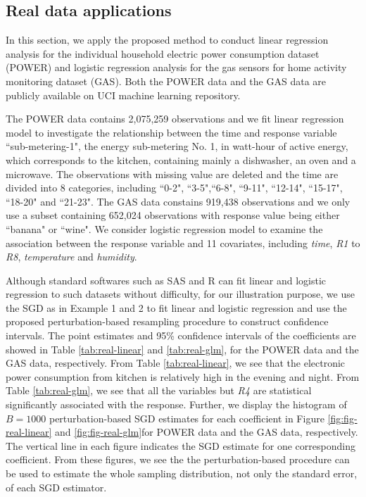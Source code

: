 \documentclass[12pt]{article}
\begin{document}
\subsection{Real data applications}

In this section, we apply the proposed method to conduct linear regression analysis for the individual household electric power consumption dataset (POWER) and logistic regression analysis for the gas sensors for home activity monitoring dataset (GAS). Both the POWER data and the GAS data are publicly available on UCI machine learning repository.

The POWER data contains 2,075,259 observations and we fit linear regression model to investigate the relationship between the time and response variable ``sub-metering-1", the energy sub-metering No. 1, in watt-hour of active energy, which corresponds to the kitchen, containing mainly a dishwasher, an oven and a microwave. The observations with missing value are deleted and the time are divided into 8 categories, including ``0-2", ``3-5",``6-8", ``9-11", ``12-14", ``15-17", ``18-20" and ``21-23". The GAS data  constains 919,438 observations and we only use a subset containing 652,024 observations with response value being either ``banana" or ``wine". We consider logistic regression model to examine the association between the response variable and 11 covariates, including {\it time}, {\it R1} to {\it R8}, {\it temperature} and {\it humidity}.

Although standard softwares such as SAS and R can fit linear and logistic regression to such datasets without difficulty, for our illustration purpose, we use the SGD as in Example 1 and 2 to fit linear and logistic regression and use the proposed perturbation-based resampling procedure to construct confidence intervals. The point estimates and 95\% confidence intervals of the coefficients are showed in Table \ref{tab:real-linear} and \ref{tab:real-glm}, for the POWER data and the GAS data, respectively. From Table \ref{tab:real-linear}, we see that the electronic power consumption from kitchen is relatively high in the evening and night. From Table \ref{tab:real-glm}, we see that all the variables but {\it R4} are statistical significantly associated with the response. Further, we display the histogram of $B=1000$ perturbation-based SGD estimates for each coefficient in Figure \ref{fig:fig-real-linear} and \ref{fig:fig-real-glm}for POWER data and the GAS data, respectively. The vertical line in each figure indicates the SGD estimate for one corresponding coefficient. From these figures, we see the the perturbation-based procedure can be used to estimate the whole sampling distribution, not only the standard error, of each SGD estimator.
\end{document}
